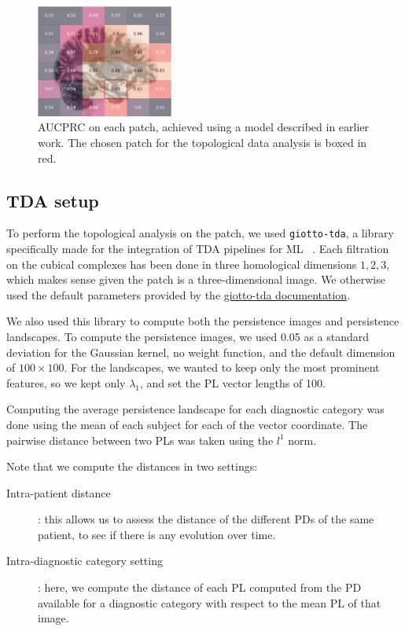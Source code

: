\documentclass{article}
\begin{document}
\begin{figure}
  \centering
  \includegraphics[width=0.4\textwidth]{figures/patch_performance.png}
  \caption{AUCPRC on each patch, achieved using a model described in earlier work. The chosen patch for the topological data analysis is boxed in red.}
  \label{fig:aucprc}
\end{figure}

\subsection{TDA setup}\label{sec:tda_setup}

To perform the topological analysis on the patch, we used \texttt{giotto-tda}, a library specifically made for the integration of TDA pipelines for ML ~\citep{tauzin2020giottotda}. Each filtration on the cubical complexes has been done in three homological dimensions $1,2,3$, which makes sense given the patch is a three-dimensional image. We otherwise used the default parameters provided by the \href{https://giotto-ai.github.io/gtda-docs/latest/modules/generated/homology/gtda.homology.CubicalPersistence.html#id2}{giotto-tda documentation}.

We also used this library to compute both the persistence images and persistence landscapes. To compute the persistence images, we used 0.05 as a standard deviation for the Gaussian kernel, no weight function, and the default dimension of $100 \times 100$. For the landscapes, we wanted to keep only the most prominent features, so we kept only $\lambda_1$, and set the PL vector lengths of 100.

Computing the average persistence landscape for each diagnostic category was done using the mean of each subject for each of the vector coordinate. The pairwise distance between two PLs was taken using the $l^1$ norm.

Note that we compute the distances in two settings:
\begin{description}
\item[Intra-patient distance]: this allows us to assess the distance of the different PDs of the same patient, to see if there is any evolution over time.
\item[Intra-diagnostic category setting]: here, we compute the
distance of each PL computed from the PD available for a diagnostic category with respect to the mean PL of that image.
\end{description}
\end{document}
